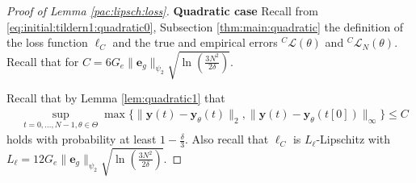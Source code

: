 \documentclass{article}
\newcommand{\e}{\mathbf{e}}
\newcommand{\y}{\mathbf{y}}
\newcommand{\bP}{\mathbf{P}}
\begin{document}
\begin{proof}[Proof of Lemma \ref{pac:lipsch:loss}]

\textbf{Quadratic case}
Recall from \eqref{eq:initial:tildern1:quadratic0}, Subsection \ref{thm:main:quadratic} the definition of the loss
  function $\ell_C$ and the true and empirical errors
  ${}^C \mathcal{L}(\theta)$ and ${}^C \mathcal{L}_N(\theta)$.
  Recall that for $C=6G_e\|\e_g\|_{\psi_2}\sqrt{\ln(\frac{3N^2}{2\delta})}$. 

  Recall that  by Lemma \ref{lem:quadratic1} that 
   \begin{equation}
  \label{quadratic:lipschitz:eq1}
  \begin{aligned}
   & \sup_{t=0,\ldots,N-1, \theta \in \Theta} \max\{\|\y(t)-\y_{\theta}(t)\|_2, \|\y(t)-\y_{\theta}(t[0])\|_\infty\} \le C %
   \end{aligned}
   \end{equation}
   holds with probability at least $1-\frac{\delta}{3}$. 
   Also recall that $\ell_C$ is $L_{\ell}$-Lipschitz with   $L_{\ell} = 12G_e \|\e_g\|_{\psi_2} \sqrt{\ln\left(\frac{3N^2}{2\delta}\right)}$.


\end{proof}
\end{document}

